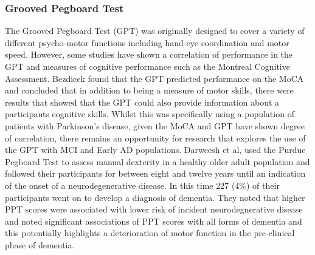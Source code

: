 \documentclass{article}
\begin{document}
\subsubsection{Grooved Pegboard Test}
The Grooved Pegboard Test (GPT) was originally designed to cover a variety of different psycho-motor functions including hand-eye coordination and motor speed. However, some studies have shown a correlation of performance in the GPT and measures of cognitive performance such as the Montreal Cognitive Assessment.
Bezdicek found that the GPT predicted performance on the MoCA and concluded that in addition to being a measure of motor skills, there were results that showed that the GPT could also provide information about a participants cognitive skills. Whilst this was specifically using a population of patients with Parkinson's disease, given the MoCA and GPT have shown degree of correlation, there remains an opportunity for research that explores the use of the GPT with MCI and Early AD populations.
Darweesh et al, used the Purdue Pegboard Test to assess manual dexterity in a healthy older adult population and followed their participants for between eight and twelve years until an indication of the onset of a neurodegenerative disease. In this time 227 (4\%) of their participants went on to develop a diagnosis of dementia. They noted that higher PPT scores were associated with lower risk of incident neurodegnerative disease and noted significant associations of PPT scores with all forms of dementia and this potentially highlights a deterioration of motor function in the pre-clinical  phase of dementia.
\end{document}
